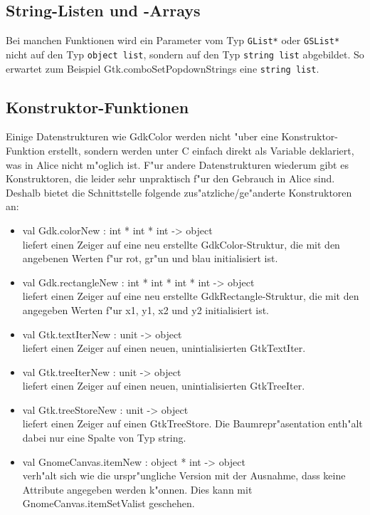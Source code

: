 \documentclass{article}
\begin{document}
\subsection{String-Listen und -Arrays}

Bei manchen Funktionen wird ein Parameter vom Typ \texttt{GList*} oder 
\texttt{GSList*} nicht auf den Typ \texttt{object list}, sondern auf den Typ
\texttt{string list} abgebildet.
So erwartet zum Beispiel Gtk.comboSetPopdownStrings eine \texttt{string list}.

\subsection{Konstruktor-Funktionen}

Einige Datenstrukturen wie GdkColor werden nicht "uber eine 
Konstruktor-Funktion erstellt, sondern werden unter C einfach direkt als
Variable deklariert, was in Alice nicht m"oglich ist. F"ur andere
Datenstrukturen wiederum gibt es Konstruktoren, die leider sehr unpraktisch
f"ur den Gebrauch in Alice sind. Deshalb bietet die Schnittstelle folgende
zus"atzliche/ge"anderte Konstruktoren an:

\begin{itemize}
\item val Gdk.colorNew : int * int * int -> object\\
      liefert einen Zeiger auf eine neu erstellte GdkColor-Struktur, die mit
      den angebenen Werten f"ur rot, gr"un und blau initialisiert ist.
\item val Gdk.rectangleNew : int * int * int * int -> object\\
      liefert einen Zeiger auf eine neu erstellte GdkRectangle-Struktur, die
      mit den angegeben Werten f"ur x1, y1, x2 und y2 initialisiert ist.
\item val Gtk.textIterNew : unit -> object\\
      liefert einen Zeiger auf einen neuen, unintialisierten GtkTextIter.
\item val Gtk.treeIterNew : unit -> object\\
      liefert einen Zeiger auf einen neuen, unintialisierten GtkTreeIter.
\item val Gtk.treeStoreNew : unit -> object\\
      liefert einen Zeiger auf einen GtkTreeStore. Die Baumrepr"asentation
      enth"alt dabei nur eine Spalte von Typ string.
\item val GnomeCanvas.itemNew : object * int -> object\\
      verh"alt sich wie die urspr"ungliche Version mit der Ausnahme, dass
      keine Attribute angegeben werden k"onnen. Dies kann mit
      GnomeCanvas.itemSetValist geschehen.
\end{itemize}
\end{document}
